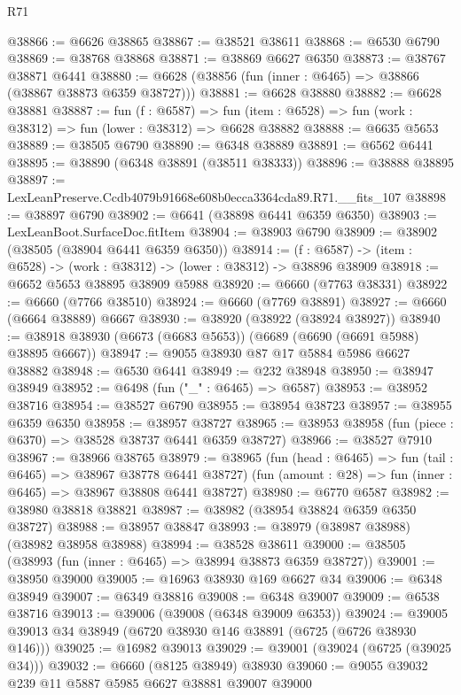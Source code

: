 \begin{lexlean}{R71}
\begin{coremodule}
@38866 := @6626 @38865
@38867 := @38521 @38611
@38868 := @6530 @6790
@38869 := @38768 @38868
@38871 := @38869 @6627 @6350
@38873 := @38767 @38871 @6441
@38880 := @6628 (@38856 (fun (inner : @6465) => @38866 (@38867 @38873 @6359 @38727)))
@38881 := @6628 @38880
@38882 := @6628 @38881
@38887 := fun (f : @6587) =>
  fun (item : @6528) => fun (work : @38312) => fun (lower : @38312) => @6628 @38882
@38888 := @6635 @5653
@38889 := @38505 @6790
@38890 := @6348 @38889
@38891 := @6562 @6441
@38895 := @38890 (@6348 @38891 (@38511 @38333))
@38896 := @38888 @38895
@38897 := LexLeanPreserve.Ccdb4079b91668e608b0ecca3364cda89.R71.__fits_107
@38898 := @38897 @6790
@38902 := @6641 (@38898 @6441 @6359 @6350)
@38903 := LexLeanBoot.SurfaceDoc.fitItem
@38904 := @38903 @6790
@38909 := @38902 (@38505 (@38904 @6441 @6359 @6350))
@38914 := (f : @6587) -> (item : @6528) -> (work : @38312) -> (lower : @38312) -> @38896 @38909
@38918 := @6652 @5653 @38895 @38909 @5988
@38920 := @6660 (@7763 @38331)
@38922 := @6660 (@7766 @38510)
@38924 := @6660 (@7769 @38891)
@38927 := @6660 (@6664 @38889) @6667
@38930 := @38920 (@38922 (@38924 @38927))
@38940 := @38918 @38930 (@6673 (@6683 @5653)) (@6689 (@6690 (@6691 @5988) @38895 @6667))
@38947 := @9055 @38930 @87 @17 @5884 @5986 @6627 @38882
@38948 := @6530 @6441
@38949 := @232 @38948
@38950 := @38947 @38949
@38952 := @6498 (fun ("_" : @6465) => @6587)
@38953 := @38952 @38716
@38954 := @38527 @6790
@38955 := @38954 @38723
@38957 := @38955 @6359 @6350
@38958 := @38957 @38727
@38965 := @38953 @38958 (fun (piece : @6370) => @38528 @38737 @6441 @6359 @38727)
@38966 := @38527 @7910
@38967 := @38966 @38765
@38979 := @38965
    (fun (head : @6465) => fun (tail : @6465) => @38967 @38778 @6441 @38727)
    (fun (amount : @28) => fun (inner : @6465) => @38967 @38808 @6441 @38727)
@38980 := @6770 @6587
@38982 := @38980 @38818 @38821
@38987 := @38982 (@38954 @38824 @6359 @6350 @38727)
@38988 := @38957 @38847
@38993 := @38979 (@38987 @38988) (@38982 @38958 @38988)
@38994 := @38528 @38611
@39000 := @38505 (@38993 (fun (inner : @6465) => @38994 @38873 @6359 @38727))
@39001 := @38950 @39000
@39005 := @16963 @38930 @169 @6627 @34
@39006 := @6348 @38949
@39007 := @6349 @38816
@39008 := @6348 @39007
@39009 := @6538 @38716
@39013 := @39006 (@39008 (@6348 @39009 @6353))
@39024 := @39005 @39013 @34 @38949 (@6720 @38930 @146 @38891 (@6725 (@6726 @38930 @146)))
@39025 := @16982 @39013
@39029 := @39001 (@39024 (@6725 (@39025 @34)))
@39032 := @6660 (@8125 @38949) @38930
@39060 := @9055
    @39032
    @239
    @11
    @5887
    @5985
    @6627
    @38881
    @39007
    @39000

\end{coremodule}
\end{lexlean}
